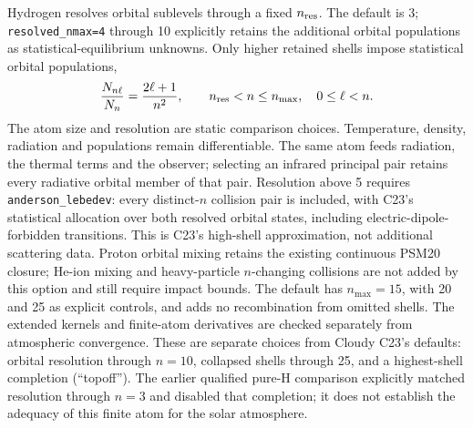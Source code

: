 \documentclass[10pt,a4paper]{article}
\begin{document}
Hydrogen resolves orbital sublevels through a fixed $n_{\rm res}$.
The default is 3; \texttt{resolved\_nmax=4} through 10 explicitly retains the
additional orbital populations as statistical-equilibrium unknowns.
Only higher retained shells impose statistical orbital populations,
\begin{equation}
 \frac{N_{n\ell}}{N_n}=\frac{2\ell+1}{n^2},
 \qquad n_{\rm res}<n\leq n_{\max},\quad 0\leq\ell<n.
 \label{eq:hydrogen_shells}
\end{equation}
The atom size and resolution are static comparison choices. Temperature,
density, radiation and populations remain differentiable. The same atom
feeds radiation, the thermal terms and the observer; selecting an infrared
principal pair retains every radiative orbital member of that pair.
Resolution above 5 requires \texttt{anderson\_lebedev}: every distinct-$n$
collision pair is included, with C23's statistical allocation over both
resolved orbital states, including electric-dipole-forbidden transitions.
This is C23's high-shell approximation, not additional scattering data.
Proton orbital mixing retains the existing continuous PSM20 closure;
He-ion mixing and heavy-particle $n$-changing collisions are not added by
this option and still require impact bounds.
The default has $n_{\max}=15$, with 20 and 25 as explicit controls,
and adds no recombination from omitted shells. The extended kernels and
finite-atom derivatives are checked separately from atmospheric convergence.
These are separate choices
from Cloudy C23's defaults: orbital resolution through $n=10$, collapsed
shells through 25, and a highest-shell completion (``topoff''). The earlier
qualified pure-H comparison explicitly matched resolution through $n=3$
and disabled that completion; it does not establish the adequacy of this
finite atom for the solar atmosphere.
\end{document}
